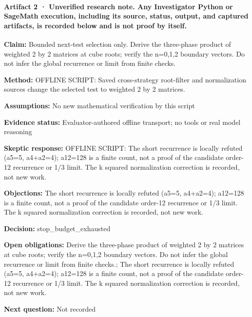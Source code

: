 \documentclass[11pt]{article}
\begin{document}
\paragraph{Artifact 2 · Unverified research note. Any Investigator Python or SageMath execution, including its source, status, output, and captured artifacts, is recorded below and is not proof by itself.}
\textbf{Claim:} Bounded next-test selection only. Derive the three-phase product of weighted 2 by 2 matrices at cube roots; verify the n=0,1,2 boundary vectors. Do not infer the global recurrence or limit from finite checks.\par
\textbf{Method:} OFFLINE SCRIPT: Saved cross-strategy root-filter and normalization sources change the selected test to weighted 2 by 2 matrices.\par
\textbf{Assumptions:} No new mathematical verification by this script\par
\textbf{Evidence status:} Evaluator-authored offline transport; no tools or real model reasoning\par
\textbf{Skeptic response:} OFFLINE SCRIPT: The short recurrence is locally refuted (a5=5, a4+a2=4); a12=128 is a finite count, not a proof of the candidate order-12 recurrence or 1/3 limit. The k squared normalization correction is recorded, not new work.\par
\textbf{Objections:} The short recurrence is locally refuted (a5=5, a4+a2=4); a12=128 is a finite count, not a proof of the candidate order-12 recurrence or 1/3 limit. The k squared normalization correction is recorded, not new work.\par
\textbf{Decision:} stop\_budget\_exhausted\par
\textbf{Open obligations:} Derive the three-phase product of weighted 2 by 2 matrices at cube roots; verify the n=0,1,2 boundary vectors. Do not infer the global recurrence or limit from finite checks.; The short recurrence is locally refuted (a5=5, a4+a2=4); a12=128 is a finite count, not a proof of the candidate order-12 recurrence or 1/3 limit. The k squared normalization correction is recorded, not new work.\par
\textbf{Next question:} Not recorded\par
\end{document}
